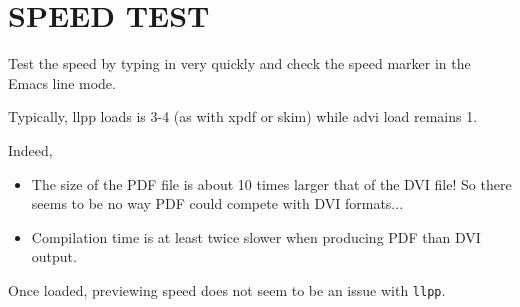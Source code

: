 \documentclass{article}
\begin{document}
\section {SPEED TEST}

Test the speed by typing in very quickly and check the speed marker in
the Emacs line mode.

Typically, llpp loads is 3-4 (as with xpdf or skim) while advi load remains
1.

Indeed,
\begin{itemize}

\item 
The size of the PDF file is about 10 times larger that of the DVI file!
So there seems to be no way PDF could compete with DVI formats...

\item
Compilation time is at least twice slower when producing PDF than DVI
output. 

\end{itemize}
Once loaded, previewing speed does not seem to be an issue with \verb"llpp".
\end{document}
